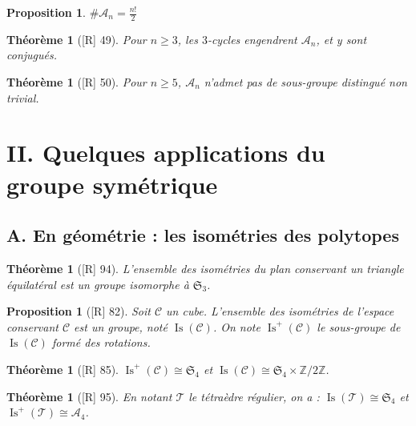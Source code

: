 \documentclass[10pt, a4paper, parskip=full, twoside, twocolumn]{report}
\newtheorem{theorem}[definition]{Théorème}
\newtheorem{proposition}[definition]{Proposition}
\newcommand{\IZ}{\mathbb{Z}}
\DeclareMathOperator{\Is}{Is}
\begin{document}
\begin{proposition}
	$\#\mathcal{A}_n = \frac{n!}{2}$
\end{proposition}

\begin{theorem}[\textnormal{[R] 49}]
	Pour $n\geq 3$, les $3$-cycles engendrent $\mathcal{A}_n$, et y sont conjugués.
\end{theorem}

\begin{theorem}[\textnormal{[R] 50}]
	Pour $n\geq 5$, $\mathcal{A}_n$ n'admet pas de sous-groupe distingué non trivial.
\end{theorem}

\section*{II. Quelques applications du groupe symétrique}
\subsection*{A. En géométrie : les isométries des polytopes}

\begin{theorem}[\textnormal{[R] 94}]
	L'ensemble des isométries du plan conservant un triangle équilatéral est un groupe isomorphe à $\mathfrak{S}_3$.
\end{theorem}

\begin{proposition}[\textnormal{[R] 82}]
	Soit $\mathcal{C}$ un cube. L'ensemble des isométries de l'espace conservant $\mathcal{C}$ est un groupe, noté $\Is(\mathcal{C})$.
	On note $\Is^+(\mathcal{C})$ le sous-groupe de $\Is(\mathcal{C})$ formé des rotations.
\end{proposition}

\begin{tcolorbox}[
    breakable, %
    colback=developpement, %
    colframe=gray!0!black, %
    boxrule=0pt, %
    arc=1mm, %
	boxsep=0pt,
	left=0pt, right=0pt, top=0pt, bottom=0pt
]
\begin{theorem}[\textnormal{[R] 85}]
	\label{105dev1}
	$\Is^+(\mathcal{C}) \cong \mathfrak{S}_4$ et $\Is(\mathcal{C})\cong \mathfrak{S}_4\times \IZ/2\IZ$.
\end{theorem}
\end{tcolorbox}

\begin{theorem}[\textnormal{[R] 95}]
	En notant $\mathcal{T}$ le tétraèdre régulier, on a :
	$\Is(\mathcal{T})\cong \mathfrak{S}_4$ et $\Is^+(\mathcal{T})\cong \mathcal{A}_4$.
\end{theorem}
\end{document}
